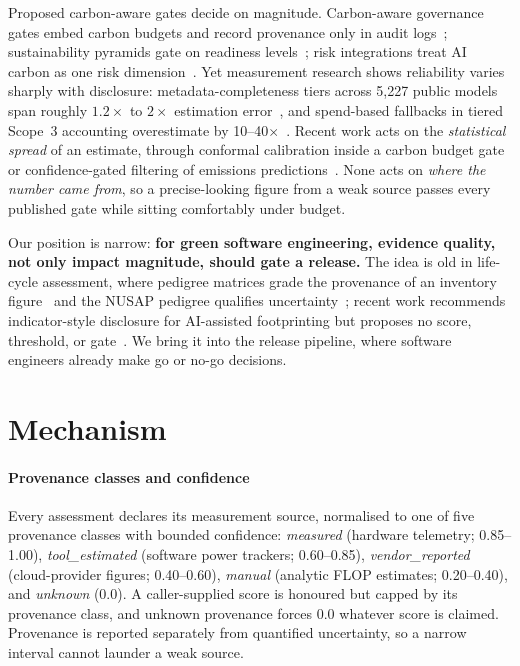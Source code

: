 \documentclass[10pt,conference]{IEEEtran}
\begin{document}
Proposed carbon-aware gates decide on magnitude. Carbon-aware governance gates
embed carbon budgets and record provenance only in audit logs~\cite{cagg};
sustainability pyramids gate on readiness levels~\cite{gtrace}; risk
integrations treat AI carbon as one risk dimension~\cite{tkachenko}. Yet
measurement research shows reliability varies sharply with disclosure:
metadata-completeness tiers across 5{,}227 public models span roughly
$1.2\times$ to $2\times$ estimation error~\cite{huggingcarbon}, and spend-based
fallbacks in tiered Scope~3 accounting overestimate by
10--40$\times$~\cite{scope3}. Recent work acts on the \emph{statistical spread}
of an estimate, through conformal calibration inside a carbon budget
gate~\cite{greensarc} or confidence-gated filtering of emissions
predictions~\cite{trustpems}. None acts on \emph{where the number came from}, so
a precise-looking figure from a weak source passes every published gate while
sitting comfortably under budget.

Our position is narrow: \textbf{for green software engineering, evidence
quality, not only impact magnitude, should gate a release.} The idea is old in
life-cycle assessment, where pedigree matrices grade the provenance of an
inventory figure~\cite{weidema} and the NUSAP pedigree qualifies
uncertainty~\cite{nusap}; recent work recommends indicator-style disclosure for
AI-assisted footprinting but proposes no score, threshold, or
gate~\cite{credible}. We bring it into the release pipeline, where software
engineers already make go or no-go decisions.

\section{Mechanism}

\paragraph{Provenance classes and confidence} Every assessment declares its
measurement source, normalised to one of five provenance classes with bounded
confidence: \emph{measured} (hardware telemetry; 0.85--1.00),
\emph{tool\_estimated} (software power trackers; 0.60--0.85),
\emph{vendor\_reported} (cloud-provider figures; 0.40--0.60), \emph{manual}
(analytic FLOP estimates; 0.20--0.40), and \emph{unknown} (0.0). A
caller-supplied score is honoured but capped by its provenance class, and
unknown provenance forces 0.0 whatever score is claimed. Provenance is reported
separately from quantified uncertainty, so a narrow interval cannot launder a
weak source.
\end{document}
